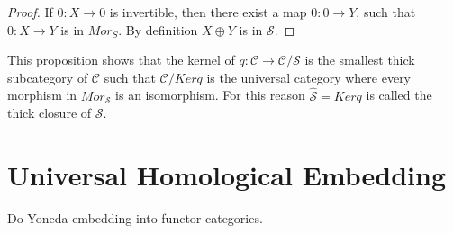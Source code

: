     \begin{proof}
        If $0:X\rightarrow 0$ is invertible, then there exist a map $0:0\rightarrow Y$, such that $0:X\rightarrow Y$ is in $Mor_S$. By definition $X\oplus Y$ is in $\mathcal{S}$.
    \end{proof}

    This proposition shows that the kernel of $q:\mathcal{C}\rightarrow\mathcal{C}/\mathcal{S}$ is the smallest thick subcategory of $\mathcal{C}$ such that $\mathcal{C}/Kerq$ is the universal category where every morphism in $Mor_\mathcal{S}$ is an isomorphism. For this reason $\widehat{\mathcal{S}}=Kerq$ is called the thick closure of $\mathcal{S}$.

\section{Universal Homological Embedding}
    Do Yoneda embedding into functor categories.

